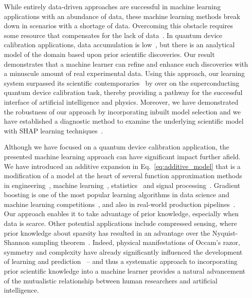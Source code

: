 \documentclass[aps,twocolumn,superscriptaddress,floatfix,preprintnumbers,showkeys]{revtex4}
\begin{document}
While entirely data-driven approaches are successful in machine learning applications with an abundance of data, these machine learning methods break down in scenarios with a shortage of data. Overcoming this obstacle requires some resource that compensates for the lack of data~\cite{Schapire_2002}. In quantum device calibration applications, data accumulation is low~\cite{Roushan_2017}, but there is an analytical model of the domain based upon prior scientific discoveries. Our result demonstrates that a machine learner can refine and enhance such discoveries with a minuscule amount of real experimental data. Using this approach, our learning system surpassed its scientific contemporaries~\cite{Roushan_2017, Neill_2018, Chiaro_2019} by over  on the superconducting quantum device calibration task, thereby providing a pathway for the successful interface of artificial intelligence and physics. Moreover, we have demonstrated the robustness of our approach by incorporating inbuilt model selection and we have established a diagnostic method to examine the underlying scientific model with SHAP learning techniques~\cite{Lundberg_2017, Molnar_2020}.

Although we have focused on a quantum device calibration application, the presented machine learning approach can have significant impact further afield. We have introduced an additive expansion in Eq.~\ref{eq:additive_model} that is a modification of a model at the heart of several function approximation methods in engineering~\cite{Powell_1987}, machine learning~\cite{Powell_1987, Schapire_1990, Freund_1995, Freund_1997, Breiman_1997_1, Mason_1999, Chen_2016, Ke_2017}, statistics~\cite{Tukey_1977, Hastie_1990, Friedman_2000, Friedman_2001, Friedman_2003, Hastie_2009} and signal processing~\cite{Mallat_1993, Vincent_2002, Donoho_2012}. Gradient boosting is one of the most popular learning algorithms in data science and machine learning competitions~\cite{Chen_2016, Ke_2017}, and also in real-world production pipelines~\cite{He_2014}. Our approach enables it to take advantage of prior knowledge, especially when data is scarce. Other potential applications include compressed sensing, where prior knowledge about sparsity has resulted in an advantage over the Nyquist-Shannon sampling theorem~\cite{Mallat_1993, Vincent_2002, Donoho_2012}. Indeed, physical manifestations of Occam's razor, symmetry and complexity have already significantly influenced the development of learning and prediction~\cite{Shalizi_2001, Gu_2012, Lin_2017, Udrescu_2020} -- and thus a systematic approach to incorporating prior scientific knowledge into a machine learner provides a natural advancement of the mutualistic relationship between human researchers and artificial intelligence.
\end{document}
